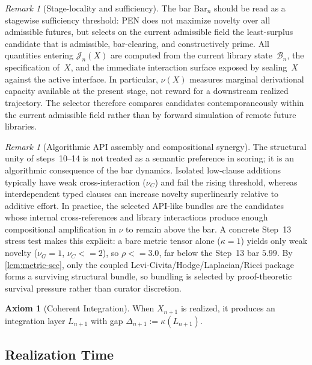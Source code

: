 \documentclass[11pt,a4paper]{article}
\def\leq{<=}%
\theoremstyle{plain}
\theoremstyle{definition}
\newtheorem{axiom}[theorem]{Axiom}
\theoremstyle{remark}
\newtheorem{remark}[theorem]{Remark}
\begin{document}
\begin{remark}[Stage-locality and sufficiency]
\label{rem:selection-locality}
The bar $\mathrm{Bar}_n$ should be read as a stagewise sufficiency threshold: PEN does not maximize novelty over all admissible futures, but selects on the current admissible field the least-surplus candidate that is admissible, bar-clearing, and constructively prime. All quantities entering $\mathcal{J}_n(X)$ are computed from the current library state~$\mathcal{B}_n$, the specification of~$X$, and the immediate interaction surface exposed by sealing~$X$ against the active interface. In particular, $\nu(X)$ measures marginal derivational capacity available at the present stage, not reward for a downstream realized trajectory. The selector therefore compares candidates contemporaneously within the current admissible field rather than by forward simulation of remote future libraries.
\end{remark}

\begin{remark}[Algorithmic API assembly and compositional synergy]
\label{rem:api-assembly}
The structural unity of steps~10--14 is not treated as a semantic preference in scoring; it is an algorithmic consequence of the bar dynamics.
Isolated low-clause additions typically have weak cross-interaction ($\nu_C$) and fail the rising threshold, whereas interdependent typed clauses can increase novelty superlinearly relative to additive effort.
In practice, the selected API-like bundles are the candidates whose internal cross-references and library interactions produce enough compositional amplification in $\nu$ to remain above the bar.
A concrete Step~13 stress test makes this explicit: a bare metric tensor alone ($\kappa=1$) yields only weak novelty ($\nu_G=1$, $\nu_C\leq 2$), so $\rho\leq 3.0$, far below the Step~13 bar $5.99$.
By \cref{lem:metric-scc}, only the coupled Levi-Civita/Hodge/Laplacian/Ricci package forms a surviving structural bundle, so bundling is selected by proof-theoretic survival pressure rather than curator discretion.
\end{remark}

\begin{axiom}[Coherent Integration]
\label{ax:integration}
When $X_{n+1}$ is realized, it produces an integration layer $L_{n+1}$ with gap $\Delta_{n+1} := \kappa(L_{n+1})$.
\end{axiom}

\subsection{Realization Time}
\end{document}
